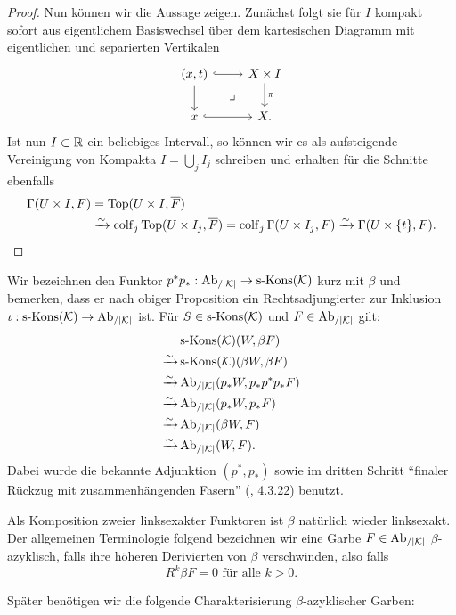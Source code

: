 \begin{proof}
  Nun können wir die Aussage zeigen. Zunächst folgt sie für $I$
  kompakt sofort aus eigentlichem Basiswechsel über dem kartesischen
  Diagramm mit eigentlichen und separierten Vertikalen
  \[ \begin{tikzcd}
    (x, t) \arrow[r, hook] \arrow[d] \arrow[dr, phantom, "\lrcorner"]
    & X \times I \arrow[d, "\pi"] \\
    x \arrow[r, hook]
    & X.
  \end{tikzcd} \]
  Ist nun $I \subset \mathbb{R}$ ein beliebiges Intervall, so können wir es
  als aufsteigende Vereinigung von Kompakta $I = \bigcup_j I_j$
  schreiben und erhalten für die Schnitte ebenfalls
  \begin{align*}
    \Gamma(U \times I, F)
     &= \operatorname{Top}(U \times I, \overline{F}) \\
     &\xrightarrow{\sim} \operatorname{colf}\limits_j \operatorname{Top}(U \times I_j, \overline{F})
     = \operatorname{colf}\limits_j \Gamma(U \times I_j, F)
     \xrightarrow{\sim} \Gamma(U \times \{t\}, F).
  \end{align*}
\end{proof}

Wir bezeichnen den Funktor $p^*p_*: \operatorname{Ab}_{/|\mathcal{K}|} \to \operatorname{s-Kons}(\mathcal{K})$ kurz mit
$\beta$ und bemerken, dass er nach obiger Proposition ein
Rechtsadjungierter zur Inklusion $\iota: \operatorname{s-Kons}(\mathcal{K}) \to \operatorname{Ab}_{/|\mathcal{K}|}$
ist. Für $S \in \operatorname{s-Kons}(\mathcal{K})$ und $F \in \operatorname{Ab}_{/|\mathcal{K}|}$ gilt:
\begin{align*}
  & \operatorname{s-Kons}(\mathcal{K})(W, \beta F) \\
  \xrightarrow{\sim} & \operatorname{s-Kons}(\mathcal{K})(\beta W, \beta F) \\
  \xrightarrow{\sim} & \operatorname{Ab}_{/|\mathcal{K}|}(p_* W, p_* p^* p_* F) \\
  \xrightarrow{\sim} & \operatorname{Ab}_{/|\mathcal{K}|}(p_* W, p_* F) \\
  \xrightarrow{\sim} & \operatorname{Ab}_{/|\mathcal{K}|}(\beta W, F) \\
  \xrightarrow{\sim} & \operatorname{Ab}_{/|\mathcal{K}|}(W, F).
\end{align*}
Dabei wurde die bekannte Adjunktion $(p^*, p_*)$ sowie im dritten
Schritt ``finaler Rückzug mit zusammenhängenden Fasern'' (\cite{TG},
4.3.22) benutzt.

Als Komposition zweier linksexakter Funktoren ist $\beta$ natürlich
wieder linksexakt. Der allgemeinen Terminologie folgend bezeichnen wir
eine Garbe $F \in \operatorname{Ab}_{/|\mathcal{K}|}$ $\beta$-azyklisch, falls ihre höheren
Derivierten von $\beta$ verschwinden, also falls
\[ R^k\beta F = 0 \text{ für alle } k > 0.  \]

Später benötigen wir die folgende Charakterisierung
$\beta$-azyklischer Garben:

